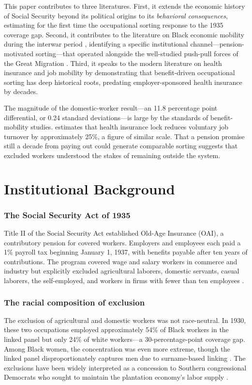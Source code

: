\documentclass[12pt]{article}
\begin{document}
This paper contributes to three literatures. First, it extends the economic history of Social Security beyond its political origins \citep{dewitt2010, katznelson2005} to its \textit{behavioral consequences}, estimating for the first time the occupational sorting response to the 1935 coverage gap. Second, it contributes to the literature on Black economic mobility during the interwar period \citep{collins1997, collins2000, margo1990, hornbeck2014}, identifying a specific institutional channel---pension-motivated sorting---that operated alongside the well-studied push-pull forces of the Great Migration \citep{boustan2010, boustan2016}. Third, it speaks to the modern literature on health insurance and job mobility \citep{gruber1994, madrian1994} by demonstrating that benefit-driven occupational sorting has deep historical roots, predating employer-sponsored health insurance by decades.

The magnitude of the domestic-worker result---an 11.8 percentage point differential, or 0.24 standard deviations---is large by the standards of benefit-mobility studies. \citet{madrian1994} estimates that health insurance lock reduces voluntary job turnover by approximately 25\%, a figure of similar scale. That a pension promise still a decade from paying out could generate comparable sorting suggests that excluded workers understood the stakes of remaining outside the system.


\section{Institutional Background}

\subsubsection*{The Social Security Act of 1935} Title II of the Social Security Act established Old-Age Insurance (OAI), a contributory pension for covered workers. Employers and employees each paid a 1\% payroll tax beginning January 1, 1937, with benefits payable after ten years of contributions. The program covered wage and salary workers in commerce and industry but explicitly excluded agricultural laborers, domestic servants, casual laborers, the self-employed, and workers in firms with fewer than ten employees \citep{dewitt2010}.

\subsubsection*{The racial composition of exclusion} The exclusion of agricultural and domestic workers was not race-neutral. In 1930, these two occupations employed approximately 54\% of Black workers in the linked panel but only 24\% of white workers---a 30-percentage-point coverage gap. Among Black women, the concentration was even more extreme, though the linked panel disproportionately captures men due to surname-based linking \citep{bailey2020}. The exclusions have been widely interpreted as a concession to Southern congressional Democrats who sought to maintain the plantation economy's labor supply \citep{katznelson2005, lieberman1998, quadagno1988}.
\end{document}
